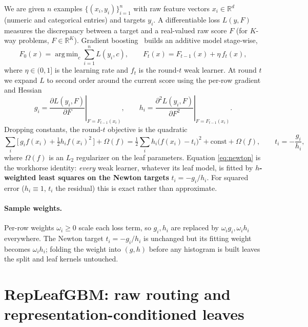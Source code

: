 \documentclass[11pt]{article}
\newcommand{\R}{\mathbb{R}}
\DeclareMathOperator*{\argmin}{arg\,min}
\begin{document}
We are given $n$ examples $\{(x_i, y_i)\}_{i=1}^{n}$ with raw feature vectors
$x_i \in \R^{d}$ (numeric and categorical entries) and targets $y_i$. A
differentiable loss $L(y, F)$ measures the discrepancy between a target and a
real-valued raw score $F$ (for $K$-way problems, $F \in \R^{K}$). Gradient
boosting~\citep{friedman2001greedy} builds an additive model stage-wise,
\begin{equation}
F_0(x) = \argmin_{c} \sum_{i=1}^{n} L(y_i, c),
\qquad
F_t(x) = F_{t-1}(x) + \eta\, f_t(x),
\label{eq:additive}
\end{equation}
where $\eta \in (0,1]$ is the learning rate and $f_t$ is the round-$t$ weak
learner. At round $t$ we expand $L$ to second order around the current score using
the per-row gradient and Hessian
\begin{equation}
g_i = \left.\frac{\partial L(y_i, F)}{\partial F}\right|_{F = F_{t-1}(x_i)},
\qquad
h_i = \left.\frac{\partial^2 L(y_i, F)}{\partial F^2}\right|_{F = F_{t-1}(x_i)} .
\end{equation}
Dropping constants, the round-$t$ objective is the quadratic
\begin{equation}
\sum_{i} \Big[\, g_i f(x_i) + \tfrac{1}{2} h_i f(x_i)^2 \,\Big] + \Omega(f)
= \tfrac{1}{2} \sum_{i} h_i \big( f(x_i) - t_i \big)^2 + \text{const} + \Omega(f),
\qquad
t_i = -\frac{g_i}{h_i},
\label{eq:newton}
\end{equation}
where $\Omega(f)$ is an $L_2$ regularizer on the leaf parameters. Equation
\eqref{eq:newton} is the workhorse identity: \emph{every} weak learner, whatever its
leaf model, is fitted by \textbf{$h$-weighted least squares on the Newton targets}
$t_i = -g_i/h_i$. For squared error ($h_i \equiv 1$, $t_i$ the residual) this is
exact rather than approximate.

\paragraph{Sample weights.}
Per-row weights $\omega_i \ge 0$ scale each loss term, so $g_i, h_i$ are replaced by
$\omega_i g_i, \omega_i h_i$ everywhere. The Newton target $t_i = -g_i/h_i$ is
unchanged but its fitting weight becomes $\omega_i h_i$; folding the weight into
$(g,h)$ before any histogram is built leaves the split and leaf kernels untouched.

\section{RepLeafGBM: raw routing and representation-conditioned leaves}
\label{sec:repleaf}
\end{document}
